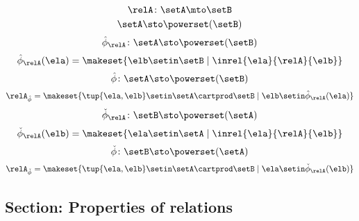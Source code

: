 \begin{forslides}
\begin{equation}
        \relA \colon \setA \mto \setB
    \end{equation}
    \begin{equation}
        \label{eq:slides_session2_rel_117}
        \setA  \sto \powerset (\setB)
    \end{equation}
    \begin{equation}
        \label{eq:slides_session2_rel_118}
        \hat \phi_{\relA} \colon \setA \sto \powerset (\setB)
    \end{equation}
    \begin{equation}
        \label{eq:slides_session2_rel_119}
        \hat \phi_{\relA} (\ela) = \makeset{ \elb \setin \setB \mid \inrel{\ela}{\relA}{\elb}}
    \end{equation}
    \begin{equation}
        \label{eq:slides_session2_rel_120}
        \hat \phi \colon \setA \sto \powerset (\setB)
    \end{equation}
    \begin{equation}
        \label{eq:slides_session2_rel_121}
        \relA_{\hat \phi} = \makeset{ \tup{\ela, \elb} \setin \setA \cartprod \setB \mid \elb \setin \hat \phi_{\relA}(\ela)  }
    \end{equation}
    \begin{equation}
        \label{eq:slides_session2_rel_122}
        \check \phi_{\relA} \colon \setB \sto \powerset (\setA)
    \end{equation}
    \begin{equation}
        \label{eq:slides_session2_rel_123}
        \check \phi_{\relA} (\elb) = \makeset{ \ela \setin \setA \mid \inrel{\ela}{\relA}{\elb}}
    \end{equation}
    \begin{equation}
        \label{eq:slides_session2_rel_124}
        \check \phi \colon \setB \sto \powerset (\setA)
    \end{equation}
    \begin{equation}
        \label{eq:slides_session2_rel_125}
        \relA_{\check \phi} = \makeset{ \tup{\ela, \elb} \setin \setA \cartprod \setB \mid \ela \setin \check \phi_{\relA}(\elb)}
    \end{equation}

    \subsection{Section: Properties of relations}


\end{forslides}
